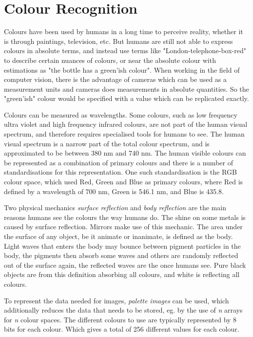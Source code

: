 \section{Colour Recognition}
Colours have been used by humans in a long time to perceive reality, whether it is through paintings, television, etc. But humans are still not able to express colours in absolute terms, and instead use terms like "London-telephone-box-red" to describe certain nuances of colours, or near the absolute colour with estimations as "the bottle has a green'ish colour".
When working in the field of computer vision, there is the advantage of cameras which can be used as a measurement units and cameras does measurements in absolute quantities. So the "green'ish" colour would be specified with a value which can be replicated exactly.

Colours can be measured as wavelengths. Some colours, such as low frequency ultra violet and high frequency infrared colours, are not part of the human visual spectrum, and therefore requires specialised tools for humans to see. The human visual spectrum is a narrow part of the total colour spectrum, and is approximated to be between 380 nm and 740 nm.
The human visible colours can be represented as a combination of primary colours and there is a number of standardisations for this representation. One such standardisation is the RGB colour space, which used Red, Green and Blue as primary colours, where Red is defined by a wavelength of 700 nm, Green is 546.1 nm, and Blue is 435.8.\citep{obj_recogn_book}

Two physical mechanics \textit{surface reflection} and \textit{body reflection} are the main reasons humans see the colours the way humans do. The shine on some metals is caused by surface reflection. Mirrors make use of this mechanic. The area under the surface of any object, be it animate or inanimate, is defined as the body. Light waves that enters the body may bounce between pigment particles in the body, the pigments then absorb some waves and others are randomly reflected out of the surface again, the reflected waves are the once humans see. Pure black objects are from this definition absorbing all colours, and white is reflecting all colours.

To represent the data needed for images, \textit{palette images} can be used, which additionally reduces the data that needs to be stored, eg. by the use of \textit{n} arrays for \textit{n} colour spaces. The different colours to use are typically represented by 8 bits for each colour. Which gives a total of 256 different values for each colour.

